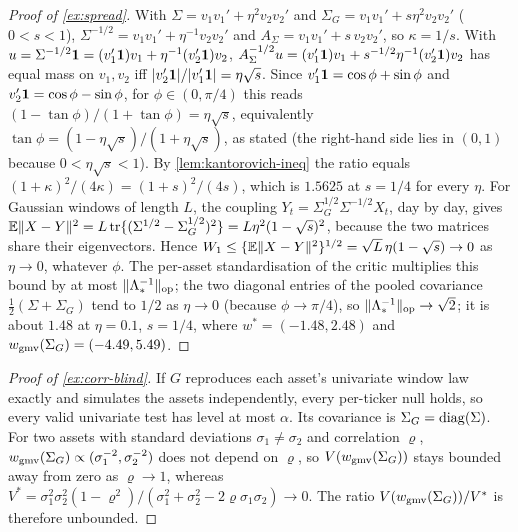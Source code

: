 \begin{proof}[Proof of \cref{ex:spread}]
With $\Sigma=v_1v_1'+\eta^2v_2v_2'$ and $\Sigma_G=v_1v_1'+s\eta^2v_2v_2'$ ($0<s<1$),
$\Sigma^{-1/2}=v_1v_1'+\eta^{-1}v_2v_2'$ and $A_\Sigma=v_1v_1'+s\,v_2v_2'$, so $\kappa=1/s$. With
$u=\Sigma^{-1/2}\mathbf{1}=(v_1'\mathbf{1})v_1+\eta^{-1}(v_2'\mathbf{1})v_2$,
$A_\Sigma^{-1/2}u=(v_1'\mathbf{1})v_1+s^{-1/2}\eta^{-1}(v_2'\mathbf{1})v_2$ has equal mass on $v_1,v_2$ iff
$\lvert v_2'\mathbf{1}\rvert/\lvert v_1'\mathbf{1}\rvert=\eta\sqrt s$. Since $v_1'\mathbf{1}=\cos\phi+\sin\phi$ and
$v_2'\mathbf{1}=\cos\phi-\sin\phi$, for $\phi\in(0,\pi/4)$ this reads
$(1-\tan\phi)/(1+\tan\phi)=\eta\sqrt s$, equivalently $\tan\phi=(1-\eta\sqrt s)/(1+\eta\sqrt s)$,
as stated (the right-hand side lies in $(0,1)$ because $0<\eta\sqrt s<1$). By
\cref{lem:kantorovich-ineq} the ratio equals $(1+\kappa)^2/(4\kappa)=(1+s)^2/(4s)$, which is
$1.5625$ at $s=1/4$ for every $\eta$. For \iid{} Gaussian windows of length $L$, the coupling
$Y_t=\Sigma_G^{1/2}\Sigma^{-1/2}X_t$, day by day, gives
$\mathbb{E}\lVert X-Y\rVert^2=L\operatorname{tr}\{(\Sigma^{1/2}-\Sigma_G^{1/2})^2\}=L\eta^2(1-\sqrt s)^2$, because the two
matrices share their eigenvectors. Hence $W_{1}\le\{\mathbb{E}\lVert X-Y\rVert^2\}^{1/2}=\sqrt L\,\eta(1-\sqrt s)\to0$
as $\eta\to0$, whatever $\phi$. The per-asset standardisation of the critic multiplies this
bound by at most $\lVert\Lambda_*^{-1}\rVert_{\mathrm{op}}$; the two diagonal entries of the pooled
covariance $\tfrac12(\Sigma+\Sigma_G)$ tend to $1/2$ as $\eta\to0$ (because $\phi\to\pi/4$), so
$\lVert\Lambda_*^{-1}\rVert_{\mathrm{op}}\to\sqrt2$; it is about $1.48$ at $\eta=0.1$, $s=1/4$, where
$w^*=(-1.48,2.48)$ and $w_{\mathrm{gmv}}(\Sigma_G)=(-4.49,5.49)$.
\end{proof}

\begin{proof}[Proof of \cref{ex:corr-blind}]
If $G$ reproduces each asset's univariate window law exactly and simulates the assets
independently, every per-ticker null holds, so every valid univariate test has level at most
$\alpha$. Its covariance is $\Sigma_G=\operatorname{diag}(\Sigma)$. For two assets with standard deviations
$\sigma_1\neq\sigma_2$ and correlation $\varrho$, $w_{\mathrm{gmv}}(\Sigma_G)\propto(\sigma_1^{-2},\sigma_2^{-2})$
does not depend on $\varrho$, so $V(w_{\mathrm{gmv}}(\Sigma_G))$ stays bounded away from zero as
$\varrho\to1$, whereas
$V^*=\sigma_1^2\sigma_2^2(1-\varrho^2)/(\sigma_1^2+\sigma_2^2-2\varrho\sigma_1\sigma_2)\to0$. The
ratio $V(w_{\mathrm{gmv}}(\Sigma_G))/V^*$ is therefore unbounded.
\end{proof}

